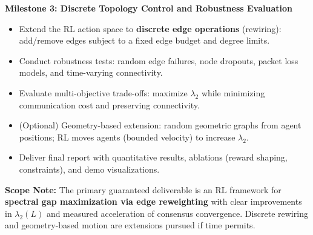 \documentclass[11pt, letterpaper]{article}
\begin{document}
\textbf{Milestone 3: Discrete Topology Control and Robustness Evaluation}  
\begin{itemize}[leftmargin=1.2em]
    \item Extend the RL action space to \textbf{discrete edge operations} (rewiring): add/remove edges subject to a fixed edge budget and degree limits.
    \item Conduct robustness tests: random edge failures, node dropouts, packet loss models, and time-varying connectivity.
    \item Evaluate multi-objective trade-offs: maximize $\lambda_2$ while minimizing communication cost and preserving connectivity.
    \item (Optional) Geometry-based extension: random geometric graphs from agent positions; RL moves agents (bounded velocity) to increase $\lambda_2$.
    \item Deliver final report with quantitative results, ablations (reward shaping, constraints), and demo visualizations.
\end{itemize}

\vspace{0.4cm}

\textbf{Scope Note:} The primary guaranteed deliverable is an RL framework for \textbf{spectral gap maximization via edge reweighting} with clear improvements in $\lambda_2(L)$ and measured acceleration of consensus convergence. Discrete rewiring and geometry-based motion are extensions pursued if time permits.
\end{document}
